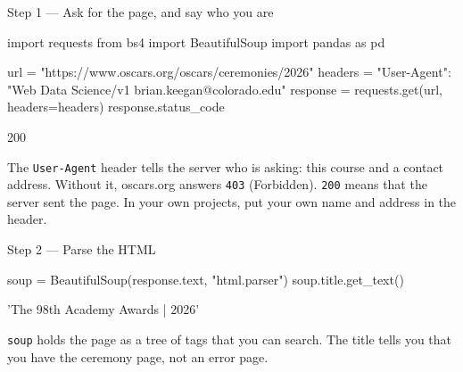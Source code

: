 \documentclass{handout}
\begin{document}
\begin{frame}{Step 1 --- Ask for the page, and say who you are}
\begin{code}
import requests
from bs4 import BeautifulSoup
import pandas as pd

url = "https://www.oscars.org/oscars/ceremonies/2026"
headers = {"User-Agent": "Web Data Science/v1 brian.keegan@colorado.edu"}
response = requests.get(url, headers=headers)
response.status_code
\end{code}
\begin{out}
200
\end{out}
The \texttt{User-Agent} header tells the server who is asking: this course
and a contact address. Without it, oscars.org answers \texttt{403}
(Forbidden). \texttt{200} means that the server sent the page. In your own
projects, put your own name and address in the header.
\end{frame}

\begin{frame}{Step 2 --- Parse the HTML}
\begin{code}
soup = BeautifulSoup(response.text, "html.parser")
soup.title.get_text()
\end{code}
\begin{out}
'The 98th Academy Awards | 2026'
\end{out}
\texttt{soup} holds the page as a tree of tags that you can search. The
title tells you that you have the ceremony page, not an error page.
\end{frame}
\end{document}
